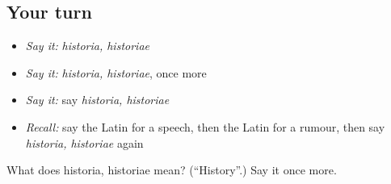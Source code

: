 \subsection*{Your turn}
\begin{itemize}
\raggedright
  \item \emph{Say it:} \emph{historia, historiae}
  \item \emph{Say it:} \emph{historia, historiae}, once more
  \item \emph{Say it:} say \emph{historia, historiae}
  \item \emph{Recall:} say the Latin for a speech, then the Latin for a rumour, then say \emph{historia, historiae} again
\end{itemize}

\begin{tcolorbox}[breakable,colback=teal!4,colframe=teal!35!black,title={Before you move on}]
What does historia, historiae mean? (\textquotedblleft{}History\textquotedblright{}.) Say it once more.
\end{tcolorbox}
